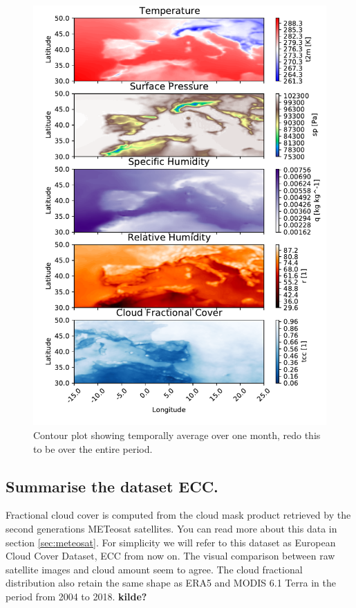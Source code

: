 \begin{figure}[ht]
    \centering
    \includegraphics{python_figs/contour_temporally_averaged.pdf}
    \caption{Contour plot showing temporally average over one month, redo this to be over the entire period.}
    \label{fig:temporally_averaged_data}
\end{figure}

\subsection{Summarise the dataset ECC.}
Fractional cloud cover is computed from the cloud mask product retrieved by the second generations METeosat satellites. You can read more about this data in section \ref{sec:meteosat}. For simplicity we will refer to this dataset as European Cloud Cover Dataset, ECC from now on. The visual comparison between raw satellite images and cloud amount seem to agree. The cloud fractional distribution also retain the same shape as ERA5 and MODIS 6.1 Terra in the period from 2004 to 2018. \textbf{kilde?}

